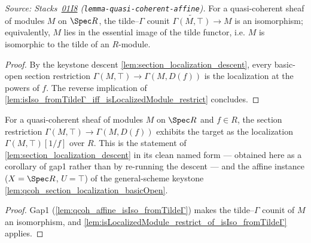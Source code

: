 \begin{lemma}
  \label{lem:qcoh_affine_isIso_fromTildeΓ}
  \leanok
  \textit{Source: Stacks~\href{https://stacks.math.columbia.edu/tag/01I8}{01I8}
  (\texttt{lemma-quasi-coherent-affine}).}
  For a quasi-coherent sheaf of modules \(M\) on \(\Spec R\), the tilde--\(\Gamma\)
  counit \(\widetilde{\Gamma(M, \top)} \to M\) is an isomorphism; equivalently, \(M\)
  lies in the essential image of the tilde functor, i.e. \(M\) is isomorphic to the
  tilde of an \(R\)-module.
\end{lemma}
\begin{proof}
  \leanok
  By the keystone descent \cref{lem:section_localization_descent}, every basic-open
  section restriction \(\Gamma(M, \top) \to \Gamma(M, D(f))\) is the localization at the
  powers of \(f\). The reverse implication of
  \cref{lem:isIso_fromTildeΓ_iff_isLocalizedModule_restrict} concludes.
\end{proof}

\begin{lemma}
  \label{lem:qcoh_affine_section_localization}
  \leanok
  For a quasi-coherent sheaf of modules \(M\) on \(\Spec R\) and \(f \in R\), the
  section restriction \(\Gamma(M, \top) \to \Gamma(M, D(f))\) exhibits the target as the
  localization \(\Gamma(M, \top)[1/f]\) over \(R\). This is the statement of
  \cref{lem:section_localization_descent} in its clean named form — obtained here as a
  corollary of gap1 rather than by re-running the descent — and the affine instance
  (\(X = \Spec R\), \(U = \top\)) of the general-scheme keystone
  \cref{lem:qcoh_section_localization_basicOpen}.
\end{lemma}
\begin{proof}
  \leanok
  Gap1 (\cref{lem:qcoh_affine_isIso_fromTildeΓ}) makes the tilde--\(\Gamma\) counit of
  \(M\) an isomorphism, and
  \cref{lem:isLocalizedModule_restrict_of_isIso_fromTildeΓ} applies.
\end{proof}


